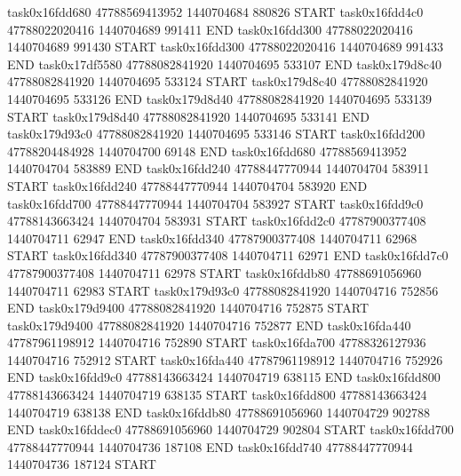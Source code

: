 task0x16fdd680 47788569413952          1440704684               880826  START
task0x16fdd4c0 47788022020416          1440704689               991411  END
task0x16fdd300 47788022020416          1440704689               991430  START
task0x16fdd300 47788022020416          1440704689               991433  END
task0x17df5580 47788082841920          1440704695               533107  END
task0x179d8c40 47788082841920          1440704695               533124  START
task0x179d8c40 47788082841920          1440704695               533126  END
task0x179d8d40 47788082841920          1440704695               533139  START
task0x179d8d40 47788082841920          1440704695               533141  END
task0x179d93c0 47788082841920          1440704695               533146  START
task0x16fdd200 47788204484928          1440704700                69148  END
task0x16fdd680 47788569413952          1440704704               583889  END
task0x16fdd240 47788447770944          1440704704               583911  START
task0x16fdd240 47788447770944          1440704704               583920  END
task0x16fdd700 47788447770944          1440704704               583927  START
task0x16fdd9c0 47788143663424          1440704704               583931  START
task0x16fdd2c0 47787900377408          1440704711                62947  END
task0x16fdd340 47787900377408          1440704711                62968  START
task0x16fdd340 47787900377408          1440704711                62971  END
task0x16fdd7c0 47787900377408          1440704711                62978  START
task0x16fddb80 47788691056960          1440704711                62983  START
task0x179d93c0 47788082841920          1440704716               752856  END
task0x179d9400 47788082841920          1440704716               752875  START
task0x179d9400 47788082841920          1440704716               752877  END
task0x16fda440 47787961198912          1440704716               752890  START
task0x16fda700 47788326127936          1440704716               752912  START
task0x16fda440 47787961198912          1440704716               752926  END
task0x16fdd9c0 47788143663424          1440704719               638115  END
task0x16fdd800 47788143663424          1440704719               638135  START
task0x16fdd800 47788143663424          1440704719               638138  END
task0x16fddb80 47788691056960          1440704729               902788  END
task0x16fddec0 47788691056960          1440704729               902804  START
task0x16fdd700 47788447770944          1440704736               187108  END
task0x16fdd740 47788447770944          1440704736               187124  START
